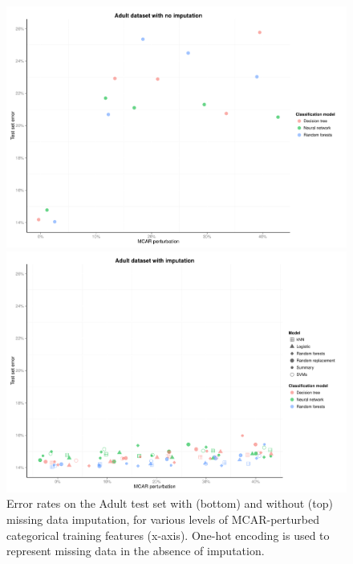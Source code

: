 \documentclass[10pt]{book}
\theoremstyle{definition}
\begin{document}
\begin{figure}[h!]
\includegraphics [scale=0.45]{figure/test-errors-adult-no-imp-mcar.pdf}\par
\includegraphics [scale=0.45]{figure/test-errors-adult-imp-mcar.pdf}\par
   \caption{\footnotesize Error rates on the Adult test set with (bottom) and without (top) missing data imputation, for various levels of MCAR-perturbed categorical training features (x-axis). One-hot encoding is used to represent missing data in the absence of imputation.} %
   \label{fig:test-error-adult-mcar}
\end{figure}
\end{document}
